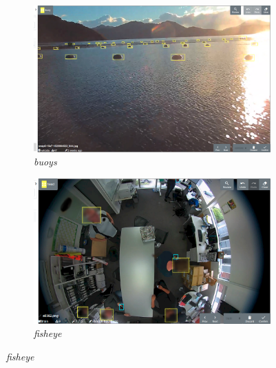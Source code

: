 \begin{figure}[htbp]
\begin{subfigure}[t]{0.24\linewidth}
  \includegraphics[width=1.0\linewidth]{figures/annotation/screenshots/buoys.png}
   \caption{\emph{buoys}}
 \end{subfigure}
\begin{subfigure}[t]{0.24\linewidth}
  \includegraphics[width=1.0\linewidth]{figures/annotation/screenshots/victor.png}
  \caption{\emph{fisheye}}
\end{subfigure}%


\end{figure}
